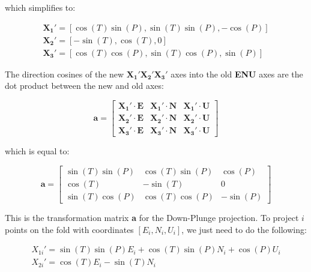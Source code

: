 \documentclass[a4paper , 12pt]{book}
\begin{document}
which simplifies to:

\begin{equation}
    \begin{split}
        \mathbf{X_1\text{$'$}} = [\cos(T)\sin(P),\sin(T)\sin(P),-\cos(P)]  \\
        \mathbf{X_2\text{$'$}} = [-\sin(T),\cos(T),0] \hspace{40pt} \\
        \mathbf{X_3\text{$'$}} = [\cos(T)\cos(P),\sin(T)\cos(P),\sin(P)]
    \end{split}
\end{equation}

The direction cosines of the new $\mathbf{X_1\text{$'$}}\mathbf{X_2\text{$'$}}\mathbf{X_3\text{$'$}}$ axes into the old \textbf{ENU} axes are the dot product between the new and old axes:

\begin{equation*}
    \textbf{a}=
    \begin{bmatrix}
    \mathbf{X_1\text{$'$}}\cdot\mathbf{E} & \mathbf{X_1\text{$'$}}\cdot\mathbf{N} & \mathbf{X_1\text{$'$}}\cdot\mathbf{U} \\
    \mathbf{X_2\text{$'$}}\cdot\mathbf{E} & \mathbf{X_2\text{$'$}}\cdot\mathbf{N} & \mathbf{X_2\text{$'$}}\cdot\mathbf{U} \\
    \mathbf{X_3\text{$'$}}\cdot\mathbf{E} & \mathbf{X_3\text{$'$}}\cdot\mathbf{N} & \mathbf{X_3\text{$'$}}\cdot\mathbf{U}
\end{bmatrix}
\end{equation*}

which is equal to:

\begin{equation}
    \textbf{a}=
    \begin{bmatrix}
    \sin(T)\sin(P) & \cos(T)\sin(P) & \cos(P) \\
    \cos(T) & -\sin(T) & 0 \\
    \sin(T)\cos(P) & \cos(T)\cos(P) & -\sin(P)
\end{bmatrix}
\end{equation}

This is the transformation matrix \textbf{a} for the Down-Plunge projection. To project $i$ points on the fold with coordinates $[E_i,N_i,U_i]$, we just need to do the following:

\begin{equation}
    \begin{split}
        X_{1i}'=\sin(T)\sin(P)E_i+\cos(T)\sin(P)N_i+\cos(P)U_i \\
        X_{2i}'=\cos(T)E_i-\sin(T)N_i  \hspace{60pt}
    \end{split}
\end{equation}
\end{document}
